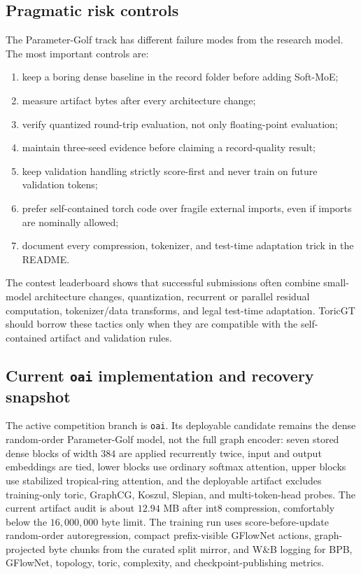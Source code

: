 \documentclass[11pt]{article}
\theoremstyle{definition}
\theoremstyle{plain}
\theoremstyle{remark}
\numberwithin{equation}{section}
\begin{document}
\subsection{Pragmatic risk controls}

The Parameter-Golf track has different failure modes from the research model.  The most important controls are:
\begin{enumerate}[leftmargin=2em]
  \item keep a boring dense baseline in the record folder before adding Soft-MoE;
  \item measure artifact bytes after every architecture change;
  \item verify quantized round-trip evaluation, not only floating-point evaluation;
  \item maintain three-seed evidence before claiming a record-quality result;
  \item keep validation handling strictly score-first and never train on future validation tokens;
  \item prefer self-contained torch code over fragile external imports, even if imports are nominally allowed;
  \item document every compression, tokenizer, and test-time adaptation trick in the README.
\end{enumerate}
The contest leaderboard shows that successful submissions often combine small-model architecture changes, quantization, recurrent or parallel residual computation, tokenizer/data transforms, and legal test-time adaptation.  ToricGT should borrow these tactics only when they are compatible with the self-contained artifact and validation rules.

\subsection{Current \texttt{oai} implementation and recovery snapshot}

The active competition branch is \texttt{oai}.  Its deployable candidate remains the dense random-order Parameter-Golf model, not the full graph encoder: seven stored dense blocks of width $384$ are applied recurrently twice, input and output embeddings are tied, lower blocks use ordinary softmax attention, upper blocks use stabilized tropical-ring attention, and the deployable artifact excludes training-only toric, GraphCG, Koszul, Slepian, and multi-token-head probes.  The current artifact audit is about $12.94$ MB after int8 compression, comfortably below the $16{,}000{,}000$ byte limit.  The training run uses score-before-update random-order autoregression, compact prefix-visible GFlowNet actions, graph-projected byte chunks from the curated split mirror, and W\&B logging for BPB, GFlowNet, topology, toric, complexity, and checkpoint-publishing metrics.
\end{document}
